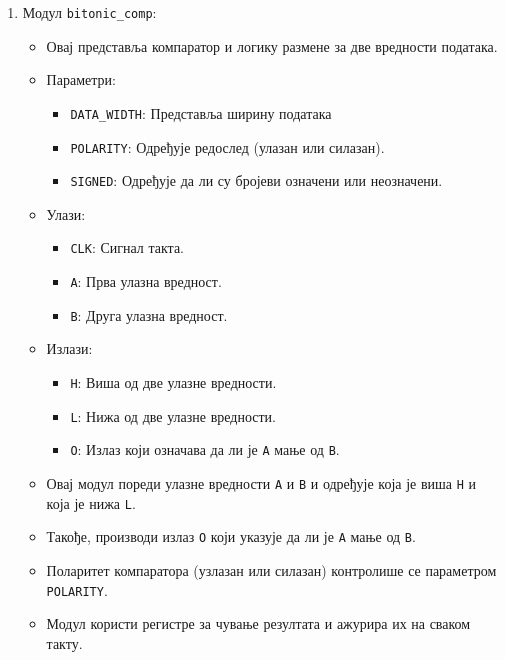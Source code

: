 \documentclass[12pt, a4paper]{article}
\theoremstyle{definition}
\begin{document}
\begin{enumerate}
 \item Модул \verb+bitonic_comp+:
 \begin{itemize}
  \item Овај представља компаратор и логику размене за две вредности података.
  \item Параметри:
  \begin{itemize}
   \item \verb+DATA_WIDTH+: Представља ширину података
   \item \verb+POLARITY+: Одређује редослед (улазан или силазан).
   \item \verb+SIGNED+: Одређује да ли су бројеви означени или неозначени.
  \end{itemize}
  \item Улази:
  \begin{itemize}
   \item \verb+CLK+: Сигнал такта.
   \item \verb+A+: Прва улазна вредност.
   \item \verb+B+: Друга улазна вредност.
  \end{itemize}
  \item Излази:
  \begin{itemize}
   \item \verb+H+: Виша од две улазне вредности.
   \item \verb+L+: Нижа од две улазне вредности.
   \item \verb+O+: Излаз који означава да ли је \verb+A+ мање од \verb+B+.
  \end{itemize}
  \item Овај модул пореди улазне вредности \verb+A+ и \verb+B+ и одређује која је виша \verb+H+ и која је нижа \verb+L+.
  \item Такође, производи излаз \verb+O+ који указује да ли је \verb+A+ мање од \verb+B+.
  \item Поларитет компаратора (узлазан или силазан) контролише се параметром \verb+POLARITY+.
  \item Модул користи регистре за чување резултата и ажурира их на сваком такту.
 \end{itemize}


\end{enumerate}
\end{document}
